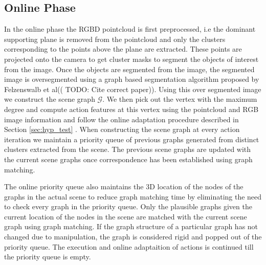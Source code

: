 \subsection{Online Phase}
In the online phase the RGBD pointcloud is first preprocessed, i.e the dominant supporting plane is removed from the pointcloud and only the clusters corresponding to the points above the plane are extracted. These points are projected onto the camera to get cluster masks to segment the objects of interest from the image. Once the objects are segmented from the image, the segmented image is oversegmented using a graph based segmentation algorithm proposed by Felzenswalb et al((\cite{Javidi12_Journal} TODO: Cite correct paper)). Using this over segmented image we construct the scene graph $\mathcal{G}$.
We then pick out the vertex with the maximum degree and compute action features at this vertex using the pointcloud and RGB image information and follow the online adaptation procedure described in Section \ref{sec:hyp_test} . When constructing the scene graph at every action iteration we maintain a priority queue of previous graphs generated from distinct clusters extracted from the scene. The previous scene graphs are updated with the current scene graphs once correspondence has been established using graph matching.

The online priority queue also maintains the 3D location of the nodes of the graphs in the actual scene to reduce graph matching time by eliminating the need to check every graph in the priority queue. Only the plausible graphs given the current location of the nodes in the scene are matched with the current scene graph using graph matching. If the graph structure of a particular graph has not changed due to manipulation, the graph is considered rigid and popped out of the priority queue. The execution and online adaptaition of actions is continued till the priority queue is empty.

